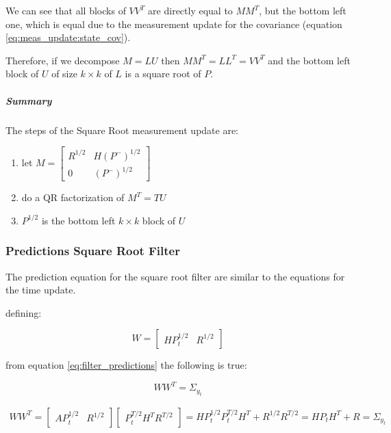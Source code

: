 \documentclass{article}
\begin{document}
We can see that all blocks of $VV^T$ are directly equal to $MM^T$, but the bottom left one, which is equal due to the measurement update for the covariance (equation \ref{eq:meas_update:state_cov}).

Therefore, if we decompose $M=LU$ then $MM^T=LL^T=VV^T$ and the bottom left block of $U$ of size $k \times k$ of $L$ is a square root of $P$.

\subparagraph{Summary} The steps of the Square Root measurement update are:
\begin{enumerate}
 \item let $M = \begin{bmatrix} R^{1/2} & H(P^-)^{1/2} \\ 0 & (P^-)^{1/2} \end{bmatrix}$
 \item do a QR factorization of $M^T=TU$
 \item $P^{1/2}$ is the bottom left $k \times k$ block of $U$
\end{enumerate}

\subsubsection{Predictions Square Root Filter}

The prediction equation for the square root filter are similar to the equations for the time update.

defining:

\begin{equation}
    W = \begin{bmatrix}HP_{t}^{1/2} & R^{1/2}\end{bmatrix}
\end{equation}

from equation \ref{eq:filter_predictions} the following is true:

\begin{equation}\label{predict_SR_mult}
WW^T = \Sigma_{y_t} 
\end{equation}

\begin{multline}
  WW^T =  \begin{bmatrix}AP_{t}^{1/2} & R^{1/2}\end{bmatrix}\begin{bmatrix}P_{t}^{T/2}H^T R^{T/2}\end{bmatrix}
  = HP_{t}^{1/2}P_{t}^{T/2}H^T + R^{1/2}R^{T/2} = HP_{t}H^T + R = \Sigma_{y_t}
\end{multline}
\end{document}
